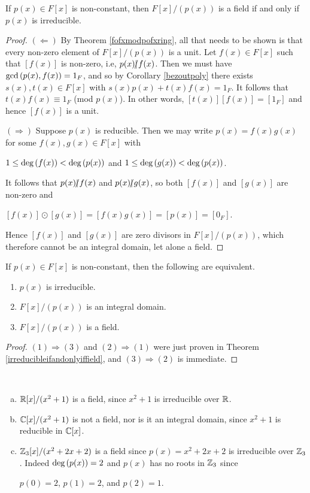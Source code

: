 \documentclass[11pt,fleqn,dvipsnames,usenames]{article}
\begin{document}
\begin{theorem}\label{irreducibleifandonlyiffield}
If $p(x)\in F[x]$ is non-constant, then $F[x]/(p(x))$ is a field if and only if $p(x)$ is irreducible.
\end{theorem}
%
\begin{proof}
$(\Leftarrow)$ By Theorem \ref{fofxmodpofxring}, all that needs to be shown is that every non-zero element of $F[x]/(p(x))$ is a unit.  Let $f(x)\in F[x]$ such that $[f(x)]$ is non-zero, i.e, $p(x)|\kern-0.9ex{/} f(x)$.  Then we must have $\GCD{p(x),f(x)} = \nolinebreak 1_{F}$, and so by Corollary \ref{bezoutpoly} there exists $s(x),t(x)\in F[x]$ with $s(x)p(x) + t(x)f(x) = 1_{F}$.  It follows that $t(x)f(x)\equiv 1_{F}$ (mod $p(x)$).  In other words, $[t(x)][f(x)] = [1_{F}]$ and hence $[f(x)]$ is a unit.
\vsp

$(\Rightarrow)$ Suppose $p(x)$ is reducible.  Then we may write $p(x) = f(x)g(x)$ for some $f(x),g(x)\in F[x]$ with
\begin{center}
$1\leq \text{deg}\left(f(x)\right) < \text{deg}\left(p(x)\right)$ and $1\leq \text{deg}\left(g(x)\right) < \text{deg}\left(p(x)\right)$.
\end{center}
It follows that $p(x)|\kern-0.9ex{/} f(x)$ and $p(x)|\kern-0.9ex{/} g(x)$, so both $[f(x)]$ and $[g(x)]$ are non-zero and
\begin{center}
$[f(x)]\odot[g(x)] = [f(x)g(x)] = [p(x)] = [0_{F}]$.
\end{center}
Hence $[f(x)]$ and $[g(x)]$ are zero divisors in $F[x]/(p(x))$, which therefore cannot be an integral domain, let alone a field.
\end{proof}
%
\begin{corollary}
If $p(x)\in F[x]$ is non-constant, then the following are equivalent.
\begin{enumerate}[(1)]
\item $p(x)$ is irreducible.
\item $F[x]/(p(x))$ is an integral domain.
\item $F[x]/(p(x))$ is a field.
\end{enumerate}
\end{corollary}
%
\begin{proof}
$(1)\Rightarrow (3)$ and $(2)\Rightarrow (1)$ were just proven in Theorem \ref{irreducibleifandonlyiffield}, and $(3)\Rightarrow (2)$ is immediate.
\end{proof}
%
\begin{examples}~
\begin{enumerate}[(a)]
\item $\mathbb{R}[x]/(x^2+1)$ is a field, since $x^2 + 1$ is irreducible over $\mathbb{R}$.
\item $\mathbb{C}[x]/(x^2+1)$ is not a field, nor is it an integral domain, since $x^2 + 1$ is reducible in $\mathbb{C}[x]$.
\item $\mathbb{Z}_3[x]/(x^2 + 2x + 2)$ is a field since $p(x) = x^2 + 2x + 2$ is irreducible over $\mathbb{Z}_3$.  Indeed $\text{deg}\left(p(x)\right) = 2$ and $p(x)$ has no roots in $\mathbb{Z}_3$ since
\begin{center}
$p(0) = 2$, $p(1) = 2$, and $p(2) = 1$.
\end{center}
\end{enumerate}
\end{examples}
\end{document}
